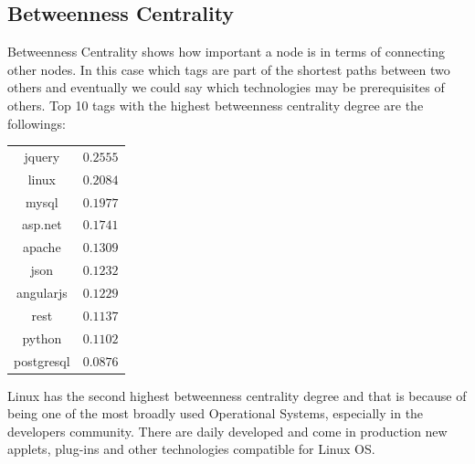\documentclass[12pt]{article}
\begin{document}
		\subsection{Betweenness Centrality}
			Betweenness Centrality shows how important a node is in terms of connecting other nodes. In this case which tags are part of the shortest paths between two others and eventually we could say which technologies may be prerequisites of others.
			Top 10 tags with the highest betweenness centrality degree are the followings:
			\begin{center}
				\begin{tabular}{ |c|c| } 
					\hline
					jquery & $0.2555$  \\ 
					linux & $0.2084$ \\
					mysql & $0.1977$ \\
					asp.net & $0.1741$ \\
					apache & $0.1309$ \\
					json &$0.1232$ \\
					angularjs & $0.1229$ \\
					rest & $0.1137$ \\
					python & $0.1102$ \\
					postgresql & $0.0876$ \\
					\hline
				\end{tabular}
			\end{center} 
		Linux has the second highest betweenness centrality degree and that is because of being one of the most broadly used Operational Systems, especially in the developers community. There are daily developed and come in production new applets, plug-ins and other technologies compatible for Linux OS.
		
\end{document}
